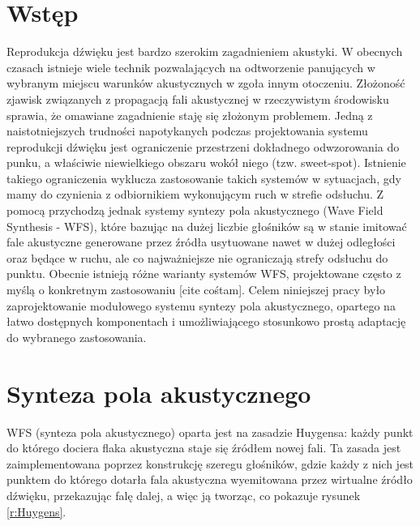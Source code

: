 \documentclass[12pt]{oska}
\affiliation{Akademia Górniczo-Hutnicza im. Stanisława Staszica w Krakowie}
\let\Oldsection\section
\renewcommand{\section}{\FloatBarrier\Oldsection}
\begin{document}
\maketitles

\section{Wstęp}

Reprodukcja dźwięku jest bardzo szerokim zagadnieniem akustyki. W obecnych
czasach istnieje wiele technik pozwalających na odtworzenie panujących w
wybranym miejscu warunków akustycznych w zgoła innym otoczeniu. Złożoność
zjawisk związanych z propagacją fali akustycznej w rzeczywistym środowisku
sprawia, że omawiane zagadnienie staję się złożonym problemem. Jedną z
naistotniejszych trudności napotykanych podczas projektowania systemu
reprodukcji dźwięku jest ograniczenie przestrzeni dokładnego odwzorowania do
punku, a właściwie niewielkiego obszaru wokół niego (tzw. sweet-spot).
Istnienie takiego ograniczenia wyklucza zastosowanie takich systemów w
sytuacjach, gdy mamy do czynienia z odbiornikiem wykonującym ruch w strefie
odsłuchu. Z pomocą przychodzą jednak systemy syntezy pola akustycznego (Wave
Field Synthesis - WFS), które bazując na dużej liczbie głośników są w stanie
imitować fale akustyczne generowane przez źródła usytuowane nawet w dużej
odległości oraz będące w ruchu, ale co najważniejsze nie ograniczają strefy
odsłuchu do punktu. Obecnie istnieją różne warianty systemów WFS, projektowane
często z myślą o konkretnym zastosowaniu [cite cośtam]. Celem niniejszej pracy
było zaprojektowanie modułowego systemu syntezy pola akustycznego, opartego na
łatwo dostępnych komponentach i umożliwiającego stosunkowo prostą adaptację do
wybranego zastosowania.

\section{Synteza pola akustycznego}

WFS (synteza pola akustycznego) oparta jest na zasadzie Huygensa: każdy punkt
do którego dociera flaka akustyczna staje się źródłem nowej fali. Ta zasada
jest zaimplementowana poprzez konstrukcję szeregu głośników, gdzie każdy z nich
jest punktem do którego dotarła fala akustyczna wyemitowana przez wirtualne
źródło dźwięku, przekazując falę dalej, a więc ją tworząc, co pokazuje rysunek
\ref{r:Huygens}.
\end{document}
